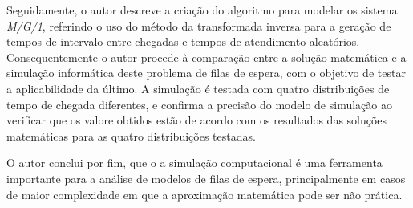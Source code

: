 Seguidamente, o autor descreve a criação do algoritmo para modelar os sistema
\emph{M/G/1}, referindo o uso do método da transformada inversa para a geração de
tempos de intervalo entre chegadas e tempos de atendimento aleatórios.
Consequentemente o autor procede à comparação entre a solução matemática
e a simulação informática deste problema de filas de espera, com o objetivo de
testar a aplicabilidade da último. A simulação é testada com quatro
distribuições de tempo de chegada diferentes, e confirma a precisão do modelo de
simulação ao verificar que os valore obtidos estão de acordo com os resultados
das soluções matemáticas para as quatro distribuições testadas.

O autor conclui por fim, que o a simulação computacional é uma ferramenta
importante para a análise de modelos de filas de espera, principalmente em casos
de maior complexidade em que a aproximação matemática pode ser não prática.



